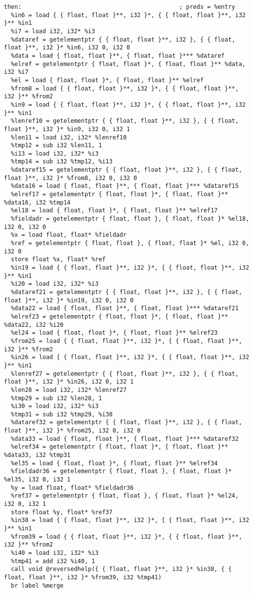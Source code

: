 \documentclass[main.tex]{subfiles}
\begin{document}
{\begin{lstlisting}
then:                                             ; preds = %entry
  %in6 = load { { float, float }**, i32 }*, { { float, float }**, i32 }** %in1
  %i7 = load i32, i32* %i3
  %dataref = getelementptr { { float, float }**, i32 }, { { float, float }**, i32 }* %in6, i32 0, i32 0
  %data = load { float, float }**, { float, float }*** %dataref
  %elref = getelementptr { float, float }*, { float, float }** %data, i32 %i7
  %el = load { float, float }*, { float, float }** %elref
  %from8 = load { { float, float }**, i32 }*, { { float, float }**, i32 }** %from2
  %in9 = load { { float, float }**, i32 }*, { { float, float }**, i32 }** %in1
  %lenref10 = getelementptr { { float, float }**, i32 }, { { float, float }**, i32 }* %in9, i32 0, i32 1
  %len11 = load i32, i32* %lenref10
  %tmp12 = sub i32 %len11, 1
  %i13 = load i32, i32* %i3
  %tmp14 = sub i32 %tmp12, %i13
  %dataref15 = getelementptr { { float, float }**, i32 }, { { float, float }**, i32 }* %from8, i32 0, i32 0
  %data16 = load { float, float }**, { float, float }*** %dataref15
  %elref17 = getelementptr { float, float }*, { float, float }** %data16, i32 %tmp14
  %el18 = load { float, float }*, { float, float }** %elref17
  %fieldadr = getelementptr { float, float }, { float, float }* %el18, i32 0, i32 0
  %x = load float, float* %fieldadr
  %ref = getelementptr { float, float }, { float, float }* %el, i32 0, i32 0
  store float %x, float* %ref
  %in19 = load { { float, float }**, i32 }*, { { float, float }**, i32 }** %in1
  %i20 = load i32, i32* %i3
  %dataref21 = getelementptr { { float, float }**, i32 }, { { float, float }**, i32 }* %in19, i32 0, i32 0
  %data22 = load { float, float }**, { float, float }*** %dataref21
  %elref23 = getelementptr { float, float }*, { float, float }** %data22, i32 %i20
  %el24 = load { float, float }*, { float, float }** %elref23
  %from25 = load { { float, float }**, i32 }*, { { float, float }**, i32 }** %from2
  %in26 = load { { float, float }**, i32 }*, { { float, float }**, i32 }** %in1
  %lenref27 = getelementptr { { float, float }**, i32 }, { { float, float }**, i32 }* %in26, i32 0, i32 1
  %len28 = load i32, i32* %lenref27
  %tmp29 = sub i32 %len28, 1
  %i30 = load i32, i32* %i3
  %tmp31 = sub i32 %tmp29, %i30
  %dataref32 = getelementptr { { float, float }**, i32 }, { { float, float }**, i32 }* %from25, i32 0, i32 0
  %data33 = load { float, float }**, { float, float }*** %dataref32
  %elref34 = getelementptr { float, float }*, { float, float }** %data33, i32 %tmp31
  %el35 = load { float, float }*, { float, float }** %elref34
  %fieldadr36 = getelementptr { float, float }, { float, float }* %el35, i32 0, i32 1
  %y = load float, float* %fieldadr36
  %ref37 = getelementptr { float, float }, { float, float }* %el24, i32 0, i32 1
  store float %y, float* %ref37
  %in38 = load { { float, float }**, i32 }*, { { float, float }**, i32 }** %in1
  %from39 = load { { float, float }**, i32 }*, { { float, float }**, i32 }** %from2
  %i40 = load i32, i32* %i3
  %tmp41 = add i32 %i40, 1
  call void @reversedhelp({ { float, float }**, i32 }* %in38, { { float, float }**, i32 }* %from39, i32 %tmp41)
  br label %merge


\end{lstlisting}}
\end{document}
